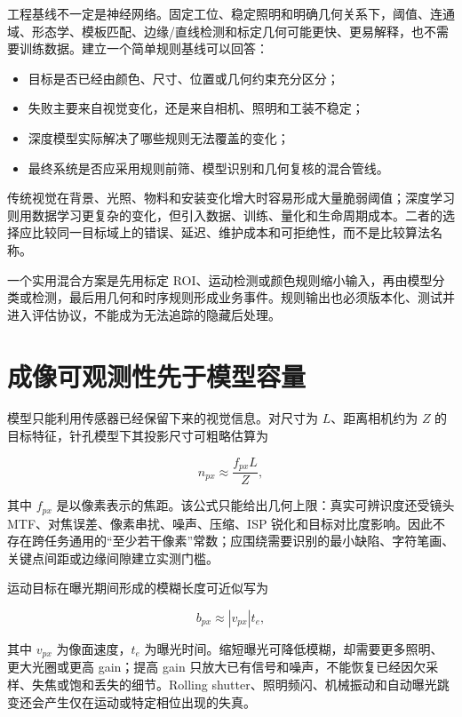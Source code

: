工程基线不一定是神经网络。固定工位、稳定照明和明确几何关系下，阈值、连通域、形态学、模板匹配、边缘/直线检测和标定几何可能更快、更易解释，也不需要训练数据。建立一个简单规则基线可以回答：

\begin{itemize}
  \item 目标是否已经由颜色、尺寸、位置或几何约束充分区分；
  \item 失败主要来自视觉变化，还是来自相机、照明和工装不稳定；
  \item 深度模型实际解决了哪些规则无法覆盖的变化；
  \item 最终系统是否应采用规则前筛、模型识别和几何复核的混合管线。
\end{itemize}

传统视觉在背景、光照、物料和安装变化增大时容易形成大量脆弱阈值；深度学习则用数据学习更复杂的变化，但引入数据、训练、量化和生命周期成本。二者的选择应比较同一目标域上的错误、延迟、维护成本和可拒绝性，而不是比较算法名称。

一个实用混合方案是先用标定 ROI、运动检测或颜色规则缩小输入，再由模型分类或检测，最后用几何和时序规则形成业务事件。规则输出也必须版本化、测试并进入评估协议，不能成为无法追踪的隐藏后处理。

\section{成像可观测性先于模型容量}

模型只能利用传感器已经保留下来的视觉信息。对尺寸为 $L$、距离相机约为 $Z$ 的目标特征，针孔模型下其投影尺寸可粗略估算为

\begin{equation}
  n_{px}\approx \frac{f_{px}L}{Z},
\end{equation}

其中 $f_{px}$ 是以像素表示的焦距\cite{multiple-view-geometry}。该公式只能给出几何上限：真实可辨识度还受镜头 MTF、对焦误差、像素串扰、噪声、压缩、ISP 锐化和目标对比度影响。因此不存在跨任务通用的“至少若干像素”常数；应围绕需要识别的最小缺陷、字符笔画、关键点间距或边缘间隙建立实测门槛。

运动目标在曝光期间形成的模糊长度可近似写为

\begin{equation}
  b_{px}\approx |v_{px}|t_e,
\end{equation}

其中 $v_{px}$ 为像面速度，$t_e$ 为曝光时间。缩短曝光可降低模糊，却需要更多照明、更大光圈或更高 gain；提高 gain 只放大已有信号和噪声，不能恢复已经因欠采样、失焦或饱和丢失的细节。Rolling shutter、照明频闪、机械振动和自动曝光跳变还会产生仅在运动或特定相位出现的失真。

